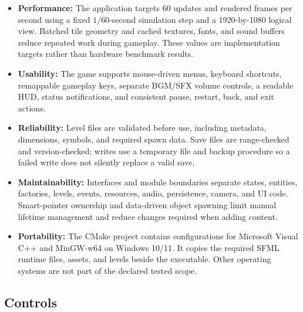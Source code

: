 \documentclass{template}
\begin{document}
\begin{itemize}
    \item \textbf{Performance:} The application targets 60 updates and rendered
          frames per second using a fixed $1/60$-second simulation step and a
          1920-by-1080 logical view. Batched tile geometry and cached textures,
          fonts, and sound buffers reduce repeated work during gameplay. These
          values are implementation targets rather than hardware benchmark
          results.
    \item \textbf{Usability:} The game supports mouse-driven menus, keyboard
          shortcuts, remappable gameplay keys, separate BGM/SFX volume controls,
          a readable HUD, status notifications, and consistent pause, restart,
          back, and exit actions.
    \item \textbf{Reliability:} Level files are validated before use, including
          metadata, dimensions, symbols, and required spawn data. Save files
          are range-checked and version-checked; writes use a temporary file
          and backup procedure so a failed write does not silently replace a
          valid save.
    \item \textbf{Maintainability:} Interfaces and module boundaries separate
          states, entities, factories, levels, events, resources, audio,
          persistence, camera, and UI code. Smart-pointer ownership and
          data-driven object spawning limit manual lifetime management and
          reduce changes required when adding content.
    \item \textbf{Portability:} The CMake project contains configurations for
          Microsoft Visual C++ and MinGW-w64 on Windows 10/11. It copies the
          required SFML runtime files, assets, and levels beside the executable.
          Other operating systems are not part of the declared tested scope.
\end{itemize}

\subsection{Controls}
\end{document}
